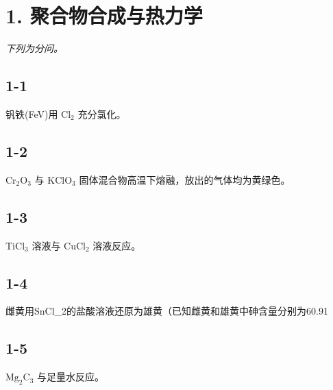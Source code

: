 \section*{1. 聚合物合成与热力学}
\textit{下列为分问。}

\subsection*{1-1}
钒铁(FeV)⽤ $\mathrm { C l } _ { 2 }$ 充分氯化。

\subsection*{1-2}
$\mathrm { { C r } _ { 2 } O _ { 3 } }$ 与 $\mathrm { K C l O _ { 3 } }$ 固体混合物⾼温下熔融，放出的⽓体均为⻩绿⾊。

\subsection*{1-3}
$\mathrm { T i C l _ { 3 } }$ 溶液与 $\mathrm { C u C l _ { 2 } }$ 溶液反应。

\subsection*{1-4}
雌⻩⽤SnCl_{2}的盐酸溶液还原为雄⻩（已知雌⻩和雄⻩中砷含量分别为60.91%

\subsection*{1-5}
$\mathrm { M g _ { 2 } C _ { 3 } }$ 与⾜量⽔反应。
